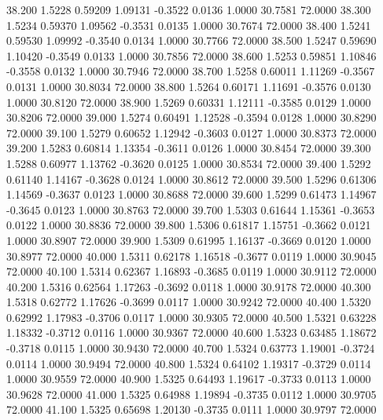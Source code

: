   38.200   1.5228   0.59209   1.09131  -0.3522   0.0136   1.0000  30.7581  72.0000
  38.300   1.5234   0.59370   1.09562  -0.3531   0.0135   1.0000  30.7674  72.0000
  38.400   1.5241   0.59530   1.09992  -0.3540   0.0134   1.0000  30.7766  72.0000
  38.500   1.5247   0.59690   1.10420  -0.3549   0.0133   1.0000  30.7856  72.0000
  38.600   1.5253   0.59851   1.10846  -0.3558   0.0132   1.0000  30.7946  72.0000
  38.700   1.5258   0.60011   1.11269  -0.3567   0.0131   1.0000  30.8034  72.0000
  38.800   1.5264   0.60171   1.11691  -0.3576   0.0130   1.0000  30.8120  72.0000
  38.900   1.5269   0.60331   1.12111  -0.3585   0.0129   1.0000  30.8206  72.0000
  39.000   1.5274   0.60491   1.12528  -0.3594   0.0128   1.0000  30.8290  72.0000
  39.100   1.5279   0.60652   1.12942  -0.3603   0.0127   1.0000  30.8373  72.0000
  39.200   1.5283   0.60814   1.13354  -0.3611   0.0126   1.0000  30.8454  72.0000
  39.300   1.5288   0.60977   1.13762  -0.3620   0.0125   1.0000  30.8534  72.0000
  39.400   1.5292   0.61140   1.14167  -0.3628   0.0124   1.0000  30.8612  72.0000
  39.500   1.5296   0.61306   1.14569  -0.3637   0.0123   1.0000  30.8688  72.0000
  39.600   1.5299   0.61473   1.14967  -0.3645   0.0123   1.0000  30.8763  72.0000
  39.700   1.5303   0.61644   1.15361  -0.3653   0.0122   1.0000  30.8836  72.0000
  39.800   1.5306   0.61817   1.15751  -0.3662   0.0121   1.0000  30.8907  72.0000
  39.900   1.5309   0.61995   1.16137  -0.3669   0.0120   1.0000  30.8977  72.0000
  40.000   1.5311   0.62178   1.16518  -0.3677   0.0119   1.0000  30.9045  72.0000
  40.100   1.5314   0.62367   1.16893  -0.3685   0.0119   1.0000  30.9112  72.0000
  40.200   1.5316   0.62564   1.17263  -0.3692   0.0118   1.0000  30.9178  72.0000
  40.300   1.5318   0.62772   1.17626  -0.3699   0.0117   1.0000  30.9242  72.0000
  40.400   1.5320   0.62992   1.17983  -0.3706   0.0117   1.0000  30.9305  72.0000
  40.500   1.5321   0.63228   1.18332  -0.3712   0.0116   1.0000  30.9367  72.0000
  40.600   1.5323   0.63485   1.18672  -0.3718   0.0115   1.0000  30.9430  72.0000
  40.700   1.5324   0.63773   1.19001  -0.3724   0.0114   1.0000  30.9494  72.0000
  40.800   1.5324   0.64102   1.19317  -0.3729   0.0114   1.0000  30.9559  72.0000
  40.900   1.5325   0.64493   1.19617  -0.3733   0.0113   1.0000  30.9628  72.0000
  41.000   1.5325   0.64988   1.19894  -0.3735   0.0112   1.0000  30.9705  72.0000
  41.100   1.5325   0.65698   1.20130  -0.3735   0.0111   1.0000  30.9797  72.0000
